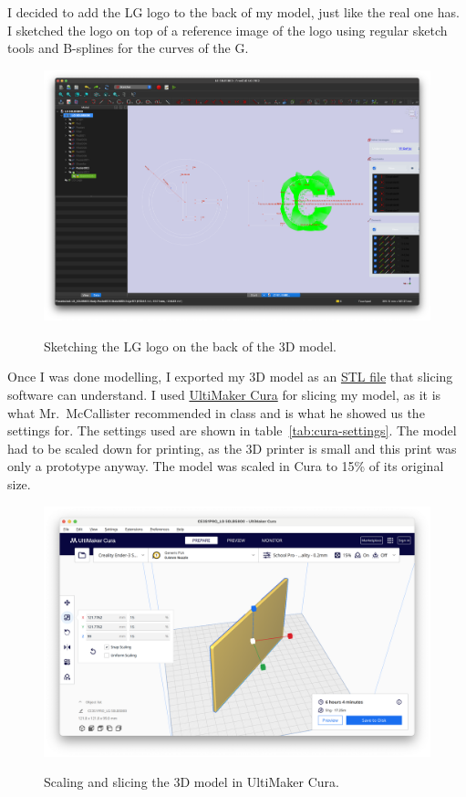 \documentclass[12pt, letterpaper]{article}
\begin{document}
I decided to add the LG logo to the back of my model, just like the
real one has. I sketched the logo on top of a reference image of the
logo using regular sketch tools and B-splines for the curves of the G.

\begin{figure}[H]
  \medskip
  \centering
  \includegraphics[width=1\linewidth]{a4}
  \caption{Sketching the LG logo on the back of the 3D model.}
  \medskip\label{fig:a4}
\end{figure}

Once I was done modelling, I exported my 3D model as an
\href{https://drive.google.com/file/d/1JmbW4QBFge6CosMKm4P-QzFGuzJ4o9Oy/view?usp=sharing}{STL
file} that slicing software can understand. I used
\href{https://ultimaker.com/software/ultimaker-cura}{UltiMaker Cura}
for slicing my model, as it is what Mr.\ McCallister recommended in
class and is what he showed us the settings for. The settings used
are shown in table~\ref{tab:cura-settings}. The model had to be
scaled down for printing, as the 3D printer is small and this print
was only a prototype anyway. The model was scaled in Cura to 15\% of
its original size.

\begin{figure}[H]
  \medskip
  \centering
  \includegraphics[width=1\linewidth]{a5-cura}
  \caption{Scaling and slicing the 3D model in UltiMaker Cura.}
  \medskip\label{fig:a5-cura}
\end{figure}
\end{document}
